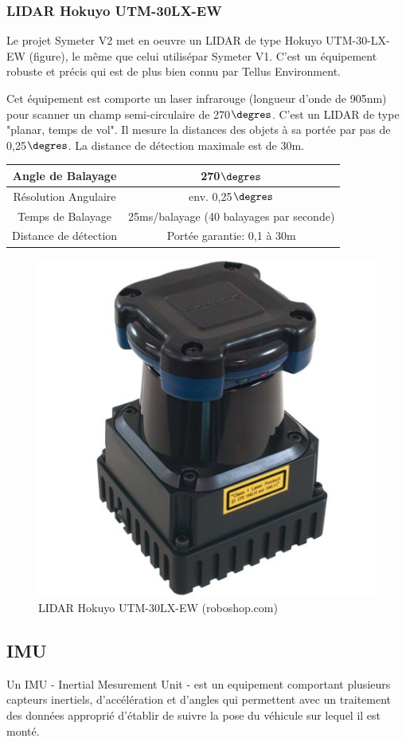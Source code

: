 \documentclass[12pt,a4paper]{report}
\begin{document}
	
		
		\subsubsection{LIDAR Hokuyo UTM-30LX-EW}
		Le projet Symeter V2 met en oeuvre un LIDAR de type Hokuyo UTM-30-LX-EW (figure), le même que celui utilisépar Symeter V1. C'est un équipement robuste et précis qui est de plus bien connu par Tellus Environment.
		
		\para Cet équipement est comporte un laser infrarouge (longueur d'onde de 905nm) pour scanner un champ semi-circulaire de 270$\degres$. C'est un LIDAR de type "planar, temps de vol". Il mesure la distances des objets à sa portée par pas de 0,25$\degres$. La distance de détection maximale est de 30m.
		\newline
		
		\begin{center}
		\begin{tabular}{|c|c|}
			\hline 
			Angle de Balayage & 270$\degres$ \\ 
			\hline 
			Résolution Angulaire & env. 0,25$\degres$ \\ 
			\hline
			Temps de Balayage & 25ms/balayage (40 balayages par seconde) \\
			\hline
			Distance de détection & Portée garantie: 0,1 à 30m \\
			\hline
		\end{tabular} 
		\end{center}
	
		\begin{figure}[h!]
			\centering
			\includegraphics[width=0.3\linewidth]{img/hokuyo-utm-30lx-ew-scanning-laser-rangefinder}
			\caption[hokuyo]{LIDAR Hokuyo UTM-30LX-EW (roboshop.com)}
			\label{fig:hokuyo-utm-30lx-ew-scanning-laser-rangefinder}
		\end{figure}
	
		
		\subsection{IMU}
		Un IMU - Inertial Mesurement Unit - est un equipement comportant plusieurs capteurs inertiels, d'accélération et d'angles qui permettent avec un traitement des données approprié d'établir de suivre la pose du véhicule sur lequel il est monté.
		
\end{document}
